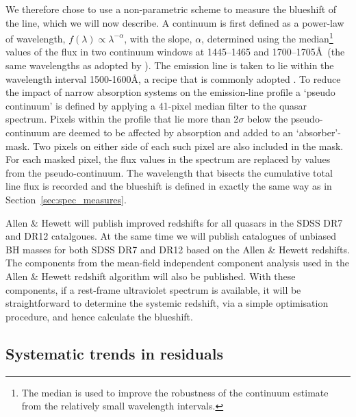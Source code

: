 We therefore chose to use a non-parametric scheme to measure the blueshift of the  line, which we will now describe. 
A continuum is first defined as a power-law of wavelength, $f(\lambda) \propto \lambda^{-\alpha}$, with the slope, $\alpha$, determined using the median\footnote{The median is used to improve the robustness of the continuum estimate from the relatively small wavelength intervals.} values of the flux in two continuum windows at 1445--1465 and 1700--1705\AA\, (the same wavelengths as adopted by \citet{shen11}). 
The  emission line is taken to lie within the wavelength interval 1500-1600\AA, a recipe that is commonly adopted \citep[e.g.][]{shen11, denney13}. 
To reduce the impact of narrow absorption systems on the emission-line profile a `pseudo continuum' is defined by applying a 41-pixel median filter to the quasar spectrum.
Pixels within the  profile that lie more than 2$\sigma$ below the pseudo-continuum are deemed to be affected by absorption and added to an `absorber'-mask. 
Two pixels on either side of each such pixel are also included in the mask. 
For each masked pixel, the flux values in the spectrum are replaced by values from the pseudo-continuum. 
The wavelength that bisects the cumulative total line flux is recorded and the blueshift is defined in exactly the same way as in Section~\ref{sec:spec_measures}. 

Allen \& Hewett will publish improved redshifts for all quasars in the SDSS DR7 and DR12 catalgoues. 
At the same time we will publish catalogues of unbiased BH masses for both SDSS DR7 and DR12 based on the Allen \& Hewett redshifts. 
The components from the mean-field independent component analysis \citep[see][for an application to astronomical spectra]{allen13} used in the Allen \& Hewett redshift algorithm will also be published.
With these components, if a rest-frame ultraviolet spectrum is available, it will be straightforward to determine the systemic redshift, via a simple optimisation procedure, and hence calculate the  blueshift. 

\subsection{Systematic trends in residuals}

